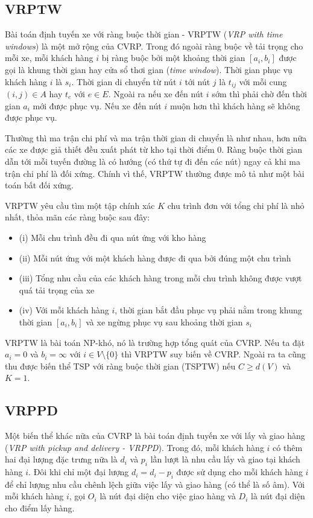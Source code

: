 \subsection{VRPTW}
Bài toán định tuyến xe với ràng buộc thời gian - VRPTW (\textit{VRP with time windows}) là một mở rộng của CVRP. Trong đó ngoài ràng buộc về tải trọng cho mỗi xe, mỗi khách hàng $i$ bị ràng buộc bởi một khoảng thời gian $[a_i, b_i]$ được gọi là khung thời gian hay cửa sổ thơi gian (\textit{time window}). Thời gian phục vụ khách hàng $i$ là $s_i$. Thời gian di chuyển từ nút $i$ tới nút $j$ là $t_{ij}$ với mỗi cung $(i,j) \in A$ hay $t_e$ với $e \in E$. Ngoài ra nếu xe đến nút $i$ sớm thì phải chờ đến thời gian $a_i$ mới được phục vụ. Nếu xe đến nút $i$ muộn hơn thì khách hàng sẽ không được phục vụ.

Thường thì ma trận chi phí và ma trận thời gian di chuyển là như nhau, hơn nữa các xe được giả thiết đều xuất phát từ kho tại thời điểm $0$. Ràng buộc thời gian dẫn tới mỗi tuyến đường là có hướng (có thứ tự đi đến các nút) ngay cả khi ma trận chi phí là đối xứng. Chính vì thế, VRPTW thường được mô tả như một bài toán bất đối xứng.

VRPTW yêu cầu tìm một tập chính xác $K$ chu trình đơn với tổng chi phí là nhỏ nhất, thỏa mãn các ràng buộc sau đây:
\begin{itemize}
	\item[] (i) Mỗi chu trình đều đi qua nút ứng với kho hàng
	\item[] (ii) Mỗi nút ứng với một khách hàng được đi qua bởi đúng một chu trình
	\item[] (iii) Tổng nhu cầu của các khách hàng trong mỗi chu trình không được vượt quá tải trọng của xe
	\item[] (iv) Với mỗi khách hàng $i$, thời gian bắt đầu phục vụ phải nằm trong khung thời gian $[a_i, b_i]$ và xe ngừng phục vụ sau khoảng thời gian $s_i$
\end{itemize}

VRPTW là bài toán NP-khó, nó là trường hợp tổng quát của CVRP. Nếu ta đặt $a_i=0$ và $b_i=\infty$ với $i \in V \setminus \{0\}$ thì VRPTW suy biến về CVRP. Ngoài ra ta cũng thu được biến thể TSP với ràng buộc thời gian (TSPTW) nếu $C \geq d(V)$ và $K=1$.

\subsection{VRPPD}
Một biến thể khác nữa của CVRP là bài toán định tuyến xe với lấy và giao hàng (\textit{VRP with pickup and delivery - VRPPD}). Trong đó, mỗi khách hàng $i$ có thêm hai đại lượng đặc trưng nữa là $d_i$ và $p_i$ lần lượt là nhu cầu lấy và giao tại khách hàng $i$. Đôi khi chỉ một đại lượng $d_i = d_i - p_i$ được sử dụng cho mỗi khách hàng $i$ để chỉ lượng nhu cầu chênh lệch giữa việc lấy và giao hàng (có thể là số âm). Với mỗi khách hàng $i$, gọi $O_i$ là nút đại diện cho việc giao hàng và $D_i$ là nút đại diện cho điểm lấy hàng.

